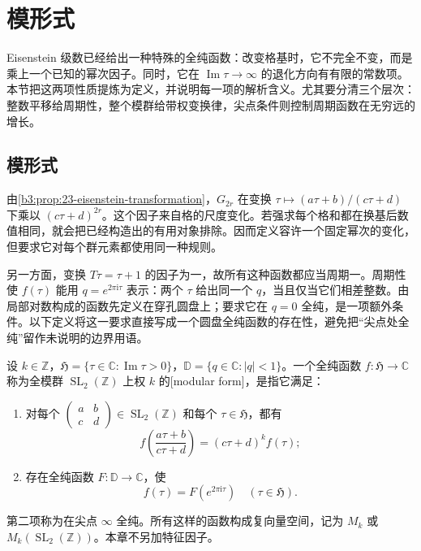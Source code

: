 \section{模形式}
\label{b3:sec:2303}

Eisenstein 级数已经给出一种特殊的全纯函数：改变格基时，它不完全不变，而是乘上一个已知的幂次因子。同时，它在 \(\operatorname{Im}\tau\to\infty\) 的退化方向有有限的常数项。本节把这两项性质提炼为定义，并说明每一项的解析含义。尤其要分清三个层次：整数平移给周期性，整个模群给带权变换律，尖点条件则控制周期函数在无穷远的增长。

\subsection{模形式}
\label{b3:subsec:230301}

由\cref{b3:prop:23-eisenstein-transformation}，\(G_{2r}\) 在变换 \(\tau\mapsto(a\tau+b)/(c\tau+d)\) 下乘以 \((c\tau+d)^{2r}\)。这个因子来自格的尺度变化。若强求每个格和都在换基后数值相同，就会把已经构造出的有用对象排除。因而定义容许一个固定幂次的变化，但要求它对每个群元素都使用同一种规则。

另一方面，变换 \(T\tau=\tau+1\) 的因子为一，故所有这种函数都应当周期一。周期性使 \(f(\tau)\) 能用 \(q=e^{2\pi\mathrm{i}\tau}\) 表示：两个 \(\tau\) 给出同一个 \(q\)，当且仅当它们相差整数。由局部对数构成的函数先定义在穿孔圆盘上；要求它在 \(q=0\) 全纯，是一项额外条件。以下定义将这一要求直接写成一个圆盘全纯函数的存在性，避免把“尖点处全纯”留作未说明的边界用语。

\begin{definition}\label{b3:def:23-modular-form}
设 \(k\in\mathbb Z\)，\(\mathfrak H=\{\tau\in\mathbb C:\operatorname{Im}\tau>0\}\)，\(\mathbb D=\{q\in\mathbb C:|q|<1\}\)。一个全纯函数 \(f:\mathfrak H\to\mathbb C\) 称为全模群 \(\operatorname{SL}_2(\mathbb Z)\) 上权 \(k\) 的[modular form]，是指它满足：
\begin{enumerate}
\item\label{b3:item:23-modular-transformation}对每个 \(\left(\begin{smallmatrix}a&b\\c&d\end{smallmatrix}\right)\in\operatorname{SL}_2(\mathbb Z)\) 和每个 \(\tau\in\mathfrak H\)，都有
\[
 f\!\left(\frac{a\tau+b}{c\tau+d}\right)
 =(c\tau+d)^k f(\tau);
\]
\item\label{b3:item:23-modular-cusp}存在全纯函数 \(F:\mathbb D\to\mathbb C\)，使
\[
 f(\tau)=F(e^{2\pi\mathrm{i}\tau})
 \quad(\tau\in\mathfrak H).
\]
\end{enumerate}
第二项称为在尖点 \(\infty\) 全纯。所有这样的函数构成复向量空间，记为 \(M_k\) 或 \(M_k(\operatorname{SL}_2(\mathbb Z))\)。本章不另加特征因子。
\end{definition}

